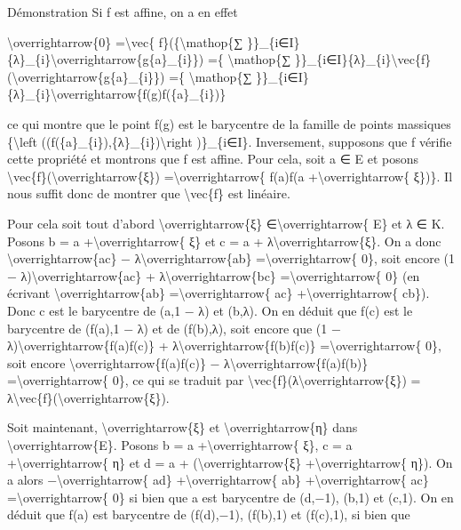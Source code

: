 \documentclass[]{article}
\begin{document}
Démonstration Si f est affine, on a en effet

\textbackslash{}overrightarrow\{0\} =\textbackslash{}vec\{
f\}(\{\textbackslash{}mathop\{∑
\}\}\_\{i∈I\}\{λ\}\_\{i\}\textbackslash{}overrightarrow\{g\{a\}\_\{i\}\})
=\{ \textbackslash{}mathop\{∑
\}\}\_\{i∈I\}\{λ\}\_\{i\}\textbackslash{}vec\{f\}(\textbackslash{}overrightarrow\{g\{a\}\_\{i\}\})
=\{ \textbackslash{}mathop\{∑
\}\}\_\{i∈I\}\{λ\}\_\{i\}\textbackslash{}overrightarrow\{f(g)f(\{a\}\_\{i\})\}

ce qui montre que le point f(g) est le barycentre de la famille de
points massiques \{\textbackslash{}left
((f(\{a\}\_\{i\}),\{λ\}\_\{i\})\textbackslash{}right )\}\_\{i∈I\}.
Inversement, supposons que f vérifie cette propriété et montrons que f
est affine. Pour cela, soit a ∈ E et posons
\textbackslash{}vec\{f\}(\textbackslash{}overrightarrow\{ξ\})
=\textbackslash{}overrightarrow\{ f(a)f(a
+\textbackslash{}overrightarrow\{ ξ\})\}. Il nous suffit donc de montrer
que \textbackslash{}vec\{f\} est linéaire.

Pour cela soit tout d'abord \textbackslash{}overrightarrow\{ξ\}
∈\textbackslash{}overrightarrow\{ E\} et λ ∈ K. Posons b = a
+\textbackslash{}overrightarrow\{ ξ\} et c = a +
λ\textbackslash{}overrightarrow\{ξ\}. On a donc
\textbackslash{}overrightarrow\{ac\} −
λ\textbackslash{}overrightarrow\{ab\} =\textbackslash{}overrightarrow\{
0\}, soit encore (1 − λ)\textbackslash{}overrightarrow\{ac\} +
λ\textbackslash{}overrightarrow\{bc\} =\textbackslash{}overrightarrow\{
0\} (en écrivant \textbackslash{}overrightarrow\{ab\}
=\textbackslash{}overrightarrow\{ ac\} +\textbackslash{}overrightarrow\{
cb\}). Donc c est le barycentre de (a,1 − λ) et (b,λ). On en déduit que
f(c) est le barycentre de (f(a),1 − λ) et de (f(b),λ), soit encore que
(1 − λ)\textbackslash{}overrightarrow\{f(a)f(c)\} +
λ\textbackslash{}overrightarrow\{f(b)f(c)\}
=\textbackslash{}overrightarrow\{ 0\}, soit encore
\textbackslash{}overrightarrow\{f(a)f(c)\} −
λ\textbackslash{}overrightarrow\{f(a)f(b)\}
=\textbackslash{}overrightarrow\{ 0\}, ce qui se traduit par
\textbackslash{}vec\{f\}(λ\textbackslash{}overrightarrow\{ξ\}) =
λ\textbackslash{}vec\{f\}(\textbackslash{}overrightarrow\{ξ\}).

Soit maintenant, \textbackslash{}overrightarrow\{ξ\} et
\textbackslash{}overrightarrow\{η\} dans
\textbackslash{}overrightarrow\{E\}. Posons b = a
+\textbackslash{}overrightarrow\{ ξ\}, c = a
+\textbackslash{}overrightarrow\{ η\} et d = a +
(\textbackslash{}overrightarrow\{ξ\} +\textbackslash{}overrightarrow\{
η\}). On a alors −\textbackslash{}overrightarrow\{ ad\}
+\textbackslash{}overrightarrow\{ ab\} +\textbackslash{}overrightarrow\{
ac\} =\textbackslash{}overrightarrow\{ 0\} si bien que a est barycentre
de (d,−1), (b,1) et (c,1). On en déduit que f(a) est barycentre de
(f(d),−1), (f(b),1) et (f(c),1), si bien que
\end{document}
